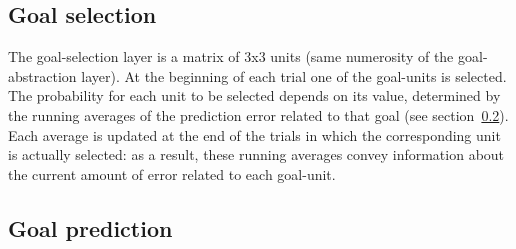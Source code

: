\documentclass[11pt]{article}
\begin{document}
%
%
%
%

\subsection{Goal selection}
\label{sec:selection}

The goal-selection layer is a matrix of 3x3 units (same numerosity
of the goal-abstraction layer). At the beginning of each trial one of the goal-units is
selected. The probability for each unit to be selected depends on its value, determined by the running averages of the prediction error related to that goal (see
section~\ref{sec:prediction}). Each average is updated at the end of the trials in
which the corresponding unit is actually selected: as a result, these
running averages convey information about the current amount of error related
to each goal-unit. 

\subsection{Goal prediction}
\label{sec:prediction}
\end{document}

